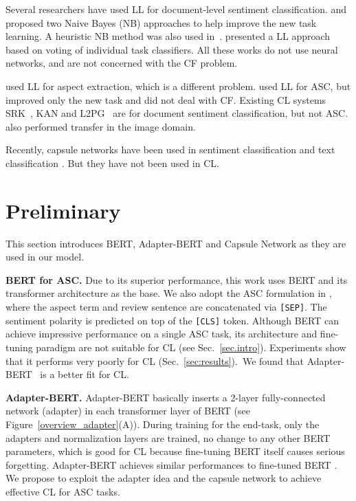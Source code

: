 \documentclass[11pt]{article}
\begin{document}
Several researchers have used LL for document-level sentiment classification.  \citet{DBLP:conf/acl/ChenM015} and~\citet{hao2019forward} proposed two Naive Bayes (NB) approaches to help improve the new task learning. A heuristic NB method was also used in~\cite{hao2019forward}.  \citet{xia2017distantly} presented {\color{black}a} LL approach based on voting of individual task classifiers. All these works do not use neural networks, and are not concerned with the CF problem. 

\citet{ShuXuLiu2017} used LL for aspect extraction, which is a different problem.  \citet{shuai2018lifelong} used LL for ASC, but improved only the new task and did not deal with CF. 
Existing CL systems SRK~\cite{DBLP:conf/dasfaa/LvWLCZ19}, KAN \cite{ke2020continual} and L2PG~\cite{qin2020using} are for document sentiment classification, but not ASC. \citet{ke2020ContinualMix} also performed transfer in the image domain. 









Recently, capsule networks \cite{hinton2011transforming} have been used in sentiment classification and text classification \cite{DBLP:conf/acl/ChenQ19,DBLP:conf/acl/ZhaoPECY19}. But they have not been used in CL.



\section{Preliminary}
\label{sec.preliminary}
This section introduces BERT, Adapter-BERT and Capsule Network as they are used in our model. 

\textbf{BERT for ASC.} Due to its superior performance, this work uses BERT \cite{DBLP:conf/naacl/DevlinCLT19} and its transformer \cite{vaswani2017attention} architecture as the base.
We also adopt the ASC formulation in \cite{DBLP:conf/naacl/XuLSY19}, where the aspect term and review sentence are concatenated via \texttt{[SEP]}. The sentiment polarity is predicted on top of the \texttt{[CLS]} token.
Although BERT can achieve impressive performance on a single ASC task, its architecture and fine-tuning paradigm are not suitable for CL (see Sec.~\ref{sec.intro}). Experiments show that it performs very poorly for CL (Sec.~\ref{sec:results}).~We found that Adapter-BERT~\cite{DBLP:conf/icml/HoulsbyGJMLGAG19} is a better fit for CL.  


\textbf{Adapter-BERT.} 
Adapter-BERT basically inserts a 2-layer fully-connected network (adapter) in each transformer layer of BERT (see Figure~\ref{overview_adapter}(A)). During training for the end-task, only the adapters and normalization layers are trained, no change to any other BERT parameters, which is good for CL because fine-tuning BERT itself causes serious forgetting. Adapter-BERT achieves similar performances to fine-tuned BERT \cite{DBLP:conf/icml/HoulsbyGJMLGAG19}. We propose to exploit the adapter idea and the capsule network to achieve effective CL for ASC tasks. 
\end{document}
